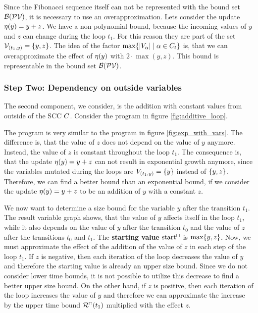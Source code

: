 Since the Fibonacci sequence itself can not be represented with the bound set $\mathcal{B}(\mathcal{PV})$, it is necessary to use an overapproximation.
Lets consider the update $\eta(y) = y + z$.
We have a non-polynomial bound, because the incoming values of $y$ and $z$ can change during the loop $t_1$.
For this reason they are part of the set $\mathcal{V}_{(t_1,y)} = \lbrace y,z \rbrace$.
The idea of the factor $\max \lbrace \left|V_\alpha\right| \mid \alpha \in C_t \rbrace$ is, that we can overapproximate the effect of $\eta(y)$ with $2 \cdot \max(y,z)$.
This bound is representable in the bound set $\mathcal{B}(\mathcal{PV})$. 

\subsubsection{Step Two: Dependency on outside variables}

The second component, we consider, is the addition with constant values from outside of the SCC $C$.
Consider the program in figure \ref{fig:additive_loop}.



The program is very similar to the program in figure \ref{fig:exp_with_vars}.
The difference is, that the value of $z$ does not depend on the value of $y$ anymore.
Instead, the value of $z$ is constant throughout the loop $t_1$.
The consequence is, that the update $\eta(y) = y + z$ can not result in exponential growth anymore, since the variables mutated during the loops are $V_{(t_1,y)} = \lbrace y \rbrace$ instead of $\lbrace y,z \rbrace$.
Therefore, we can find a better bound than an exponential bound, if we consider the update $\eta(y) = y + z$ to be an addition of $y$ with a constant $z$.

We now want to determine a size bound for the variable $y$ after the transition $t_1$.
The result variable graph shows, that the value of $y$ affects itself in the loop $t_1$, while it also depends on the value of $y$ after the transition $t_0$ and the value of $z$ after the transitions $t_0$ and $t_1$.
The \textbf{starting value} $\text{start}^\sqcap$ is $\max \lbrace y,z \rbrace$.
Now, we must approximate the effect of the addition of the value of $z$ in each step of the loop $t_1$.
If $z$ is negative, then each iteration of the loop decreases the value of $y$ and therefore the starting value is already an upper size bound.
Since we do not consider lower time bounds, it is not possible to utilize this decrease to find a better upper size bound.
On the other hand, if $z$ is positive, then each iteration of the loop increases the value of $y$ and therefore we can approximate the increase by the upper time bound ${\mathcal{R}^\sqcap}(t_1)$ multiplied with the effect $z$.

